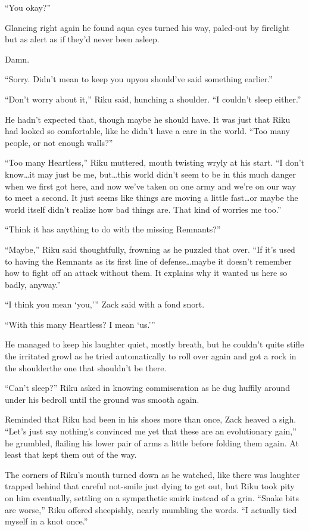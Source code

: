 ``You okay?''

Glancing right again he found aqua eyes turned his way, paled-out by firelight but as alert as if they'd never been asleep.

Damn.

``Sorry. Didn't mean to keep you up\textemdash you should've said something earlier.''

``Don't worry about it,'' Riku said, hunching a shoulder. ``I couldn't sleep either.''

He hadn't expected that, though maybe he should have. It was just that Riku had looked so comfortable, like he didn't have a care in the world. ``Too many people, or not enough walls?''

``Too many Heartless,'' Riku muttered, mouth twisting wryly at his start. ``I don't know\ldots it may just be me, but\ldots this world didn't seem to be in this much danger when we first got here, and now we've taken on one army and we're on our way to meet a second. It just seems like things are moving a little fast\ldots or maybe the world itself didn't realize how bad things are. That kind of worries me too.''

``Think it has anything to do with the missing Remnants?''

``Maybe,'' Riku said thoughtfully, frowning as he puzzled that over. ``If it's used to having the Remnants as its first line of defense\ldots maybe it doesn't remember how to fight off an attack without them. It explains why it wanted us here so badly, anyway.''

``I think you mean `you,''' Zack said with a fond snort.

``With this many Heartless? I mean `us.'''

He managed to keep his laughter quiet, mostly breath, but he couldn't quite stifle the irritated growl as he tried automatically to roll over again and got a rock in the shoulder\textemdash the one that shouldn't be there.

``Can't sleep?'' Riku asked in knowing commiseration as he dug huffily around under his bedroll until the ground was smooth again.

Reminded that Riku had been in his shoes more than once, Zack heaved a sigh. ``Let's just say nothing's convinced me yet that these are an evolutionary gain,'' he grumbled, flailing his lower pair of arms a little before folding them again. At least that kept them out of the way.

The corners of Riku's mouth turned down as he watched, like there was laughter trapped behind that careful not-smile just dying to get out, but Riku took pity on him eventually, settling on a sympathetic smirk instead of a grin. ``Snake bits are worse,'' Riku offered sheepishly, nearly mumbling the words. ``I actually tied myself in a knot once.''

